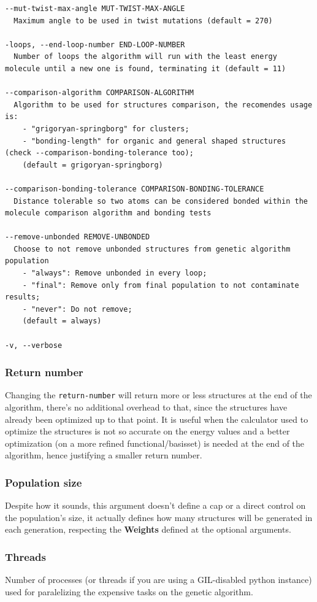 \documentclass[
  article,
  12pt,
  oneside,
  english,
  brazil,
  sumario=abnt-6027-2012,
]{abntex2}
\begin{document}
\begin{lstlisting}
--mut-twist-max-angle MUT-TWIST-MAX-ANGLE
  Maximum angle to be used in twist mutations (default = 270)

-loops, --end-loop-number END-LOOP-NUMBER
  Number of loops the algorithm will run with the least energy molecule until a new one is found, terminating it (default = 11)

--comparison-algorithm COMPARISON-ALGORITHM
  Algorithm to be used for structures comparison, the recomendes usage is:
    - "grigoryan-springborg" for clusters;
    - "bonding-length" for organic and general shaped structures (check --comparison-bonding-tolerance too);
    (default = grigoryan-springborg)

--comparison-bonding-tolerance COMPARISON-BONDING-TOLERANCE
  Distance tolerable so two atoms can be considered bonded within the molecule comparison algorithm and bonding tests

--remove-unbonded REMOVE-UNBONDED
  Choose to not remove unbonded structures from genetic algorithm population
    - "always": Remove unbonded in every loop;
    - "final": Remove only from final population to not contaminate results;
    - "never": Do not remove;
    (default = always)

-v, --verbose
\end{lstlisting}

\subsubsection{Return number}

Changing the \lstinline{return-number} will return more or less structures at the end of the algorithm, there's no additional overhead to that, since the structures have already been optimized up to that point.
It is useful when the calculator used to optimize the structures is not so accurate on the energy values and a better optimization (on a more refined functional/basisset) is needed at the end of the algorithm, hence justifying a smaller return number.

\subsubsection{Population size}
Despite how it sounds, this argument doesn't define a cap or a direct control on the population's size, it actually defines how many structures will be generated in each generation, respecting the \textbf{Weights} defined at the optional arguments.

\subsubsection{Threads}
Number of processes (or threads if you are using a GIL-disabled python instance) used for paralelizing the expensive tasks on the genetic algorithm.
\end{document}
